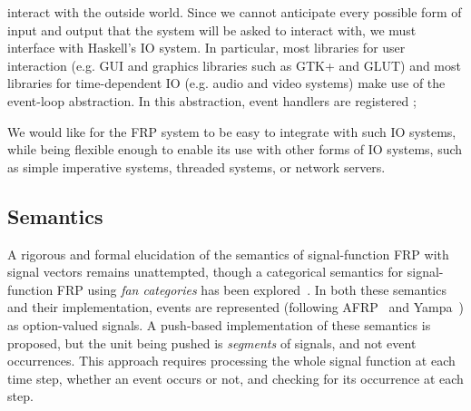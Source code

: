 interact with the outside world. Since we cannot anticipate every
possible form of input and output that the system will be asked to interact
with, we must interface with Haskell's IO system. 
In particular, most libraries
for user interaction (e.g. GUI and graphics libraries such as GTK+ and GLUT) and
most libraries for time-dependent IO (e.g. audio and video systems) make use of
the event-loop abstraction. In this abstraction, event handlers are registered
; 


We would like for the FRP system to be easy to integrate with such IO systems,
while being flexible enough to enable its use with other forms of IO systems,
such as simple imperative systems, threaded systems, or network servers.

\subsection{Semantics}
\label{subsection:System_Design_and_Interface-Semantics}

A rigorous and formal elucidation of the semantics of signal-function FRP with signal
vectors remains unattempted, though a categorical semantics for signal-function
FRP using {\em fan categories} has been explored~\cite{Jeffrey2012}. In both
these semantics and their implementation, events are represented (following
AFRP~\cite{Courtney2001-1} and Yampa~\cite{Nilsson2005}) as option-valued
signals. A push-based implementation of these semantics is proposed, but the
unit being pushed is {\em segments} of signals, and not event occurrences. This
approach requires processing the whole signal function at each time step,
whether an event occurs or not, and checking for its occurrence at each step.

